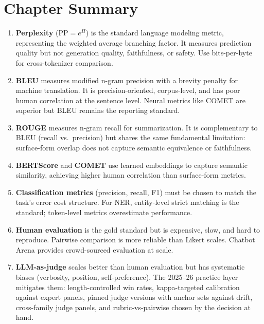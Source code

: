 \bigskip

\section*{Chapter Summary}

\begin{enumerate}
    \item \textbf{Perplexity} ($\text{PP} = e^{H}$) is the standard language
          modeling metric, representing the weighted average branching factor.
          It measures prediction quality but not generation quality, faithfulness,
          or safety.  Use bits-per-byte for cross-tokenizer comparison.

    \item \textbf{BLEU} measures modified n-gram precision with a brevity penalty
          for machine translation.  It is precision-oriented, corpus-level, and
          has poor human correlation at the sentence level.  Neural metrics like
          COMET are superior but BLEU remains the reporting standard.

    \item \textbf{ROUGE} measures n-gram recall for summarization.  It is
          complementary to BLEU (recall vs.\ precision) but shares the same
          fundamental limitation: surface-form overlap does not capture semantic
          equivalence or faithfulness.

    \item \textbf{BERTScore} and \textbf{COMET} use learned embeddings to
          capture semantic similarity, achieving higher human correlation than
          surface-form metrics.

    \item \textbf{Classification metrics} (precision, recall, F1) must be
          chosen to match the task's error cost structure.  For NER, entity-level
          strict matching is the standard; token-level metrics overestimate
          performance.

    \item \textbf{Human evaluation} is the gold standard but is expensive, slow,
          and hard to reproduce.  Pairwise comparison is more reliable than
          Likert scales.  Chatbot Arena provides crowd-sourced evaluation at
          scale.

    \item \textbf{LLM-as-judge} scales better than human evaluation but has
          systematic biases (verbosity, position, self-preference).  The
          2025--26 practice layer mitigates them: length-controlled win
          rates, kappa-targeted calibration against expert panels, pinned
          judge versions with anchor sets against drift, cross-family judge
          panels, and rubric-vs-pairwise chosen by the decision at hand.


\end{enumerate}
